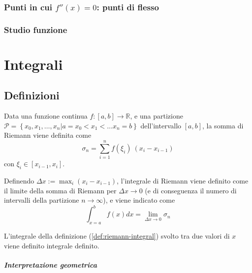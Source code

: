\subsection{Punti in cui $f''(x) = 0$: punti di flesso}

\subsection{Studio funzione}

\chapter{Integrali}\label{ch:integrals}

\section{Definizioni}
\begin{definition} Data una funzione continua $f:[a,b] \rightarrow \mathbb{R}$, e una partizione $\mathcal{P} = \left\{x_0, x_1, \dots, x_n | a = x_0 < x_1 < \dots x_n = b \right\}$ dell'intervallo $[a,b]$, la somma di Riemann viene definita come
    \begin{equation}
        \sigma_n = \sum_{i=1}^{n} f(\xi_i) \ (x_{i} - x_{i-1})
    \end{equation}
con $\xi_i \in [x_{i-1}, x_i]$.
\end{definition}

\begin{definition}\label{def:riemann-integral} Definendo $\Delta x := \max_i(x_i - x_{i-1}) $, l'integrale di Riemann viene definito come il limite della somma di Riemann per $\Delta x  \rightarrow 0$ (e di conseguenza il numero di intervalli della partizione $n \rightarrow \infty$), e viene indicato come
    \begin{equation}
        \int_{x=a}^b f(x) dx = \lim_{\Delta x \rightarrow 0} \sigma_n
    \end{equation}
\end{definition}

\begin{definition} L'integrale della definizione (\ref{def:riemann-integral}) svolto tra due valori di $x$ viene definito integrale definito. 
\end{definition}

\paragraph{Interpretazione geometrica}

